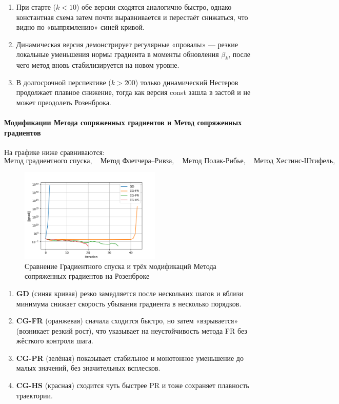 \documentclass[a4paper]{article}
\begin{document}
\begin{enumerate}
  \item При старте (\(k<10\)) обе версии сходятся аналогично быстро, однако константная схема затем почти выравнивается и перестаёт снижаться, что видно по «выпрямлению» синей кривой.
  \item Динамическая версия демонстрирует регулярные «провалы» — резкие локальные уменьшения нормы градиента в моменты обновления \(\beta_k\), после чего метод вновь стабилизируется на новом уровне.
  \item В долгосрочной перспективе (\(k>200\)) только динамический Нестеров продолжает плавное снижение, тогда как версия const зашла в застой и не может преодолеть Розенброка.
\end{enumerate}

\paragraph{Модификации Метода сопряженных градиентов и Метод сопряженных градиентов}  
На графике ниже сравниваются:
\[
\text{Метод градиентного спуска},\quad
\text{Метод Флетчера–Ривза},\quad
\text{Метод Полак-Рибье},\quad
\text{Метод Хестинс-Штифель},
\]

\begin{figure}[H]
  \centering
  \includegraphics[width=0.6\textwidth]{images/task3_cg_variants.png}
  \caption{Сравнение Градиентного спуска и трёх модификаций Метода сопряженных градиентов на Розенброке}
\end{figure}

\begin{enumerate}
  \item \textbf{GD} (синяя кривая) резко замедляется после нескольких шагов и вблизи минимума снижает скорость убывания градиента в несколько порядков.
  \item \textbf{CG-FR} (оранжевая) сначала сходится быстро, но затем «взрывается» (возникает резкий рост), что указывает на неустойчивость метода FR без жёсткого контроля шага.
  \item \textbf{CG-PR} (зелёная) показывает стабильное и монотонное уменьшение до малых значений, без значительных всплесков.
  \item \textbf{CG-HS} (красная) сходится чуть быстрее PR и тоже сохраняет плавность траектории.
\end{enumerate}
\end{document}
